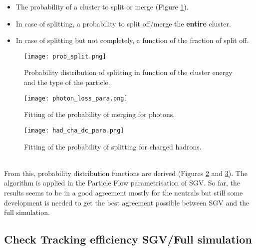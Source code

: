 \documentclass[a4paper,12pt]{article}
\begin{document}
\begin{itemize}
\item The probability of a cluster to split or merge (Figure \ref{fig:proba_split}).
\item In case of splitting, a probability to split off/merge the \textbf{entire} cluster.
\item In case of splitting but not completely, a function of the fraction of split off.
\end{itemize}
\begin{figure}[!h]
   \centering
   \texttt{[image: prob\_split.png]} 
       \caption{Probability distribution of splitting in function of the cluster energy and the type of the particle.}
   \label{fig:proba_split}
\end{figure}

\noindent
\begin{minipage}{\linewidth}
\centering
\begin{minipage}{0.4\linewidth}
\begin{figure}[H]
   \texttt{[image: photon\_loss\_para.png]} 
    \caption{Fitting of the probability of merging for photons.}
   \label{fig:proba_para}
\end{figure}
\end{minipage}
      \hspace{0.05\linewidth}
      \begin{minipage}{0.4\linewidth}
\begin{figure}[H]
    \texttt{[image: had\_cha\_dc\_para.png]} 
      \caption{Fitting of the probability of splitting for charged hadrons.}
   \label{fig:proba_para2}
\end{figure}
\end{minipage}
\end{minipage}\\[0.4cm]

\noindent
From this, probability distribution functions are derived (Figures \ref{fig:proba_para} and \ref{fig:proba_para2}). The algorithm is applied in the Particle Flow parametrisation of SGV. So far, the results seems to be in a good agreement mostly for the neutrals but still some development is needed to get the best agreement possible between SGV and the full simulation.

\subsection{Check Tracking efficiency SGV/Full simulation}
\label{sec:tracking}
\end{document}
